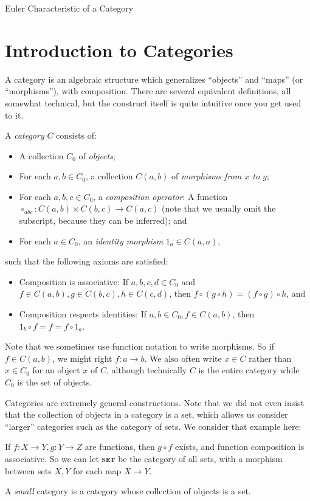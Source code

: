\documentclass[12pt]{pom_thesis}
\newcommand{\catname}[1]{\textbf{\textsc{#1}}}
\begin{document}
\begin{chapter}{Euler Characteristic of a Category}\label{chap_euler}
\section{Introduction to Categories} \label{cat_defs}

A category is an algebraic structure which generalizes ``objects'' and ``maps'' (or ``morphisms''), with composition. There are several equivalent definitions, all somewhat technical, but the construct itself is quite intuitive once you get used to it.  
\begin{defn}
A \textit{category} $C$ consists of:
\begin{itemize}
\item A collection $C_0$ of \emph{objects};
\item For each $a,b \in C_0$, a collection $C(a,b)$ of \emph{morphisms from $x$ to $y$};
\item For each $a,b,c \in C_0$, a \emph{composition operator}: A function $\circ_{abc} :C(a,b) \times C(b,c) \rightarrow C(a,c)$ (note that we usually omit the subscript, because they can be inferred); and
\item For each $a \in C_0$, an \emph{identity morphism} $1_a \in C(a,a)$,
\end{itemize}
such that the following axioms are satisfied:
\begin{itemize}
\item Composition is associative: If $a,b,c,d \in C_0$ and $f\in C(a,b), g \in C(b,c), h \in C(c,d)$, then $f \circ (g \circ h) = (f \circ g) \circ h$, and
\item Composition respects identities: If $a,b \in C_0, f \in C(a,b)$, then $1_b \circ f = f = f \circ 1_a$.
\end{itemize}
\end{defn}
Note that we sometimes use function notation to write morphisms. So if $f \in C(a,b)$, we might right $f:a \rightarrow b$. We also often write $x \in C$ rather than $x \in C_0$ for an object $x$ of $C$, although technically $C$ is the entire category while $C_0$ is the set of objects.

Categories are extremely general constructions. Note that we did not even insist that the collection of objects in a category is a set, which allows us consider ``larger'' categories such as the category of sets. We consider that example here:
\begin{examp}
If $f:X \rightarrow Y, g:Y\rightarrow Z$ are functions, then $g \circ f$ exists, and function composition is associative. So we can let \catname{set} be the category of all sets, with a morphism between sets $X,Y$ for each map $X \rightarrow Y$. 
\end{examp}
A \emph{small} category is a category whose collection of objects is a set.


\end{chapter}
\end{document}
